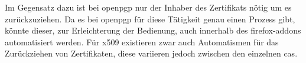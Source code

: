 Im Gegensatz dazu ist bei \gls{openpgp} nur der Inhaber des Zertifikats nötig um es zurückzuziehen. Da es bei \gls{openpgp} für diese Tätigkeit genau einen
Prozess gibt, könnte dieser, zur Erleichterung der Bedienung, auch innerhalb des \glspl{firefox-addon} automatisiert werden. Für \gls{x509} existieren zwar auch
Automatismen für das Zurückziehen von Zertifikaten, diese variieren jedoch zwischen den einzelnen \glspl{ca}.

